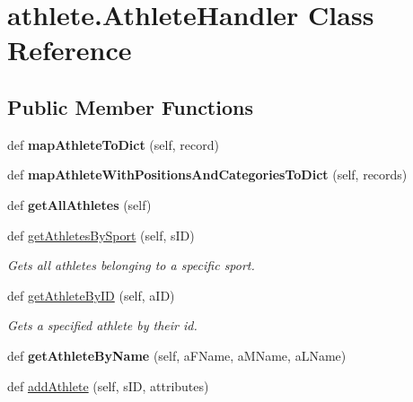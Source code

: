 \hypertarget{classathlete_1_1_athlete_handler}{}\section{athlete.\+Athlete\+Handler Class Reference}
\label{classathlete_1_1_athlete_handler}
\subsection*{Public Member Functions}
\begin{DoxyCompactItemize}
\item 
\mbox{\label{classathlete_1_1_athlete_handler_af2cea3ac6787386c0307d6cff66c87ae}} 
def {\bfseries map\+Athlete\+To\+Dict} (self, record)
\item 
\mbox{\label{classathlete_1_1_athlete_handler_a8138df89b514056a780eba25104d46ff}} 
def {\bfseries map\+Athlete\+With\+Positions\+And\+Categories\+To\+Dict} (self, records)
\item 
\mbox{\label{classathlete_1_1_athlete_handler_a3d399a95078dfad2015949c2b87bb0e1}} 
def {\bfseries get\+All\+Athletes} (self)
\item 
def \hyperlink{classathlete_1_1_athlete_handler_a915847d82761dec34fdea02e9c3c6a6b}{get\+Athletes\+By\+Sport} (self, s\+ID)
\begin{DoxyCompactList}\small\item\em Gets all athletes belonging to a specific sport. \end{DoxyCompactList}\item 
def \hyperlink{classathlete_1_1_athlete_handler_ac9887da05dcb05758b2b423e7778d504}{get\+Athlete\+By\+ID} (self, a\+ID)
\begin{DoxyCompactList}\small\item\em Gets a specified athlete by their id. \end{DoxyCompactList}\item 
\mbox{\label{classathlete_1_1_athlete_handler_ad5861802fa3c0a393d581267ffb1a3b9}} 
def {\bfseries get\+Athlete\+By\+Name} (self, a\+F\+Name, a\+M\+Name, a\+L\+Name)
\item 
def \hyperlink{classathlete_1_1_athlete_handler_a18c945d36c0ef6745bdeeba41ae16656}{add\+Athlete} (self, s\+ID, attributes)

\end{DoxyCompactItemize}
